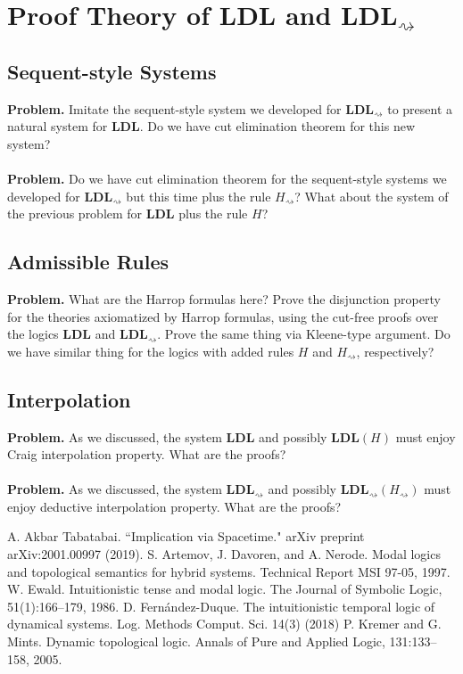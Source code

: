 \documentclass[12pt,a4paper]{article}
\theoremstyle{plain}
\theoremstyle{definition}
\begin{document}
\section{Proof Theory of $\mathbf{LDL}$ and $\mathbf{LDL}_{\rightsquigarrow}$}

\subsection{Sequent-style Systems}
\textbf{Problem.} Imitate the sequent-style system we developed for $\mathbf{LDL}_{\rightsquigarrow}$ to present a natural system for $\mathbf{LDL}$. Do we have cut elimination theorem for this new system? \\
\\
\textbf{Problem.} Do we have cut elimination theorem for the sequent-style systems we developed for $\mathbf{LDL}_{\rightsquigarrow}$ but this time plus the rule $H_{\rightsquigarrow}$? What about the system of the previous problem for $\mathbf{LDL}$ plus the rule $H$?
\subsection{Admissible Rules}
\textbf{Problem.} What are the Harrop formulas here? Prove the disjunction property for the theories axiomatized by Harrop formulas, using the cut-free proofs over the logics $\mathbf{LDL}$ and $\mathbf{LDL}_{\rightsquigarrow}$. Prove the same thing via Kleene-type argument. Do we have similar thing for the logics with added rules $H$ and $H_{\rightsquigarrow}$, respectively?
\subsection{Interpolation}
\textbf{Problem.} As we discussed, the system $\mathbf{LDL}$ and possibly $\mathbf{LDL}(H)$ must enjoy Craig interpolation property. What are the proofs?\\
\\
\textbf{Problem.} As we discussed, the system $\mathbf{LDL}_{\rightsquigarrow}$ and possibly $\mathbf{LDL}_{\rightsquigarrow}(H_{\rightsquigarrow})$ must enjoy deductive interpolation property. What are the proofs?

\begin{thebibliography}{99} 

A. Akbar Tabatabai. ``Implication via Spacetime." arXiv preprint arXiv:2001.00997 (2019).
S. Artemov, J. Davoren, and A. Nerode. Modal logics and topological semantics for hybrid systems. Technical Report MSI 97-05, 1997.
W. Ewald. Intuitionistic tense and modal logic. The Journal of Symbolic Logic, 51(1):166–179, 1986.
D. Fernández-Duque. The intuitionistic temporal logic of dynamical systems. Log. Methods Comput. Sci. 14(3) (2018)
P. Kremer and G. Mints. Dynamic topological logic. Annals of Pure and Applied Logic, 131:133–158, 2005.
 
\end{thebibliography}
\end{document}
